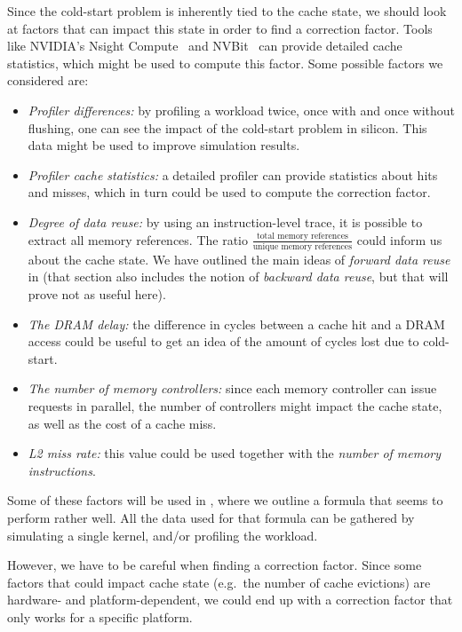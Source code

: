 Since the cold-start problem is inherently tied to the cache state, we should look at factors that can impact this state in order to find a correction factor.
Tools like NVIDIA's Nsight Compute~\cite{nsight} and NVBit~\cite{nvbit} can provide detailed cache statistics, which might be used to compute this factor.
Some possible factors we considered are:
\begin{itemize}
    \item \textit{Profiler differences:} by profiling a workload twice, once with and once without flushing, one can see the impact of the cold-start problem in silicon.
    This data might be used to improve simulation results.
    \item \textit{Profiler cache statistics:} a detailed profiler can provide statistics about hits and misses, which in turn could be used to compute the correction factor.
    \item \textit{Degree of data reuse:} by using an instruction-level trace, it is possible to extract all memory references.
    The ratio $\frac{\text{total memory references}}{\text{unique memory references}}$ could inform us about the cache state.
    We have outlined the main ideas of \textit{forward data reuse} in  (that section also includes the notion of \textit{backward data reuse}, but that will prove not as useful here).
    \item \textit{The DRAM delay:} the difference in cycles between a cache hit and a DRAM access could be useful to get an idea of the amount of cycles lost due to cold-start.
    \item \textit{The number of memory controllers:} since each memory controller can issue requests in parallel, the number of controllers might impact the cache state, as well as the cost of a cache miss.
    \item \textit{L2 miss rate:} this value could be used together with the \textit{number of memory instructions}.
\end{itemize}

Some of these factors will be used in , where we outline a formula that seems to perform rather well.
All the data used for that formula can be gathered by simulating a single kernel, and/or profiling the workload.

However, we have to be careful when finding a correction factor.
Since some factors that could impact cache state (e.g.\ the number of cache evictions) are hardware- and platform-dependent, we could end up with a correction factor that only works for a specific platform.


